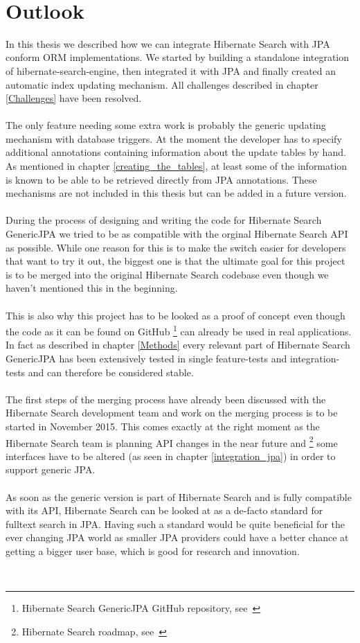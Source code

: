 
~
\pagebreak

\section{Outlook}\label{outlook}

In this thesis we described how we can integrate Hibernate Search with JPA conform ORM implementations. We started by building a standalone integration of hibernate-search-engine, then integrated it with JPA and finally created an automatic index updating mechanism. All challenges described in chapter \ref{Challenges} have been resolved.
\\\\
The only feature needing some extra work is probably the generic updating mechanism with database triggers. At the moment the developer has to specify additional annotations containing information about the update tables by hand. As mentioned in chapter \ref{creating_the_tables}, at least some of the information is known to be able to be retrieved directly from JPA annotations. These mechanisms are not included in this thesis but can be added in a future version.
\\\\
During the process of designing and writing the code for Hibernate Search GenericJPA we tried to be as compatible with the orginal Hibernate Search API as possible. While one reason for this is to make the switch easier for developers that want to try it out, the biggest one is that the ultimate goal for this project is to be merged into the original Hibernate Search codebase even though we haven't mentioned this in the beginning.
\\\\
This is also why this project has to be looked as a proof of concept even though the code as it can be found on GitHub \footnote{Hibernate Search GenericJPA GitHub repository, see~\cite{hibernate_genericjpa_github}} can already be used in real applications. In fact as described in chapter \ref{Methods} every relevant part of Hibernate Search GenericJPA has been extensively tested in single feature-tests and integration-tests and can therefore be considered stable. 
\\\\
The first steps of the merging process have already been discussed with the Hibernate Search development team and work on the merging process is to be started in November 2015. This comes exactly at the right moment as the Hibernate Search team is planning API changes in the near future and \footnote{Hibernate Search roadmap, see~\cite{hibernate_search_roadmap}} some interfaces have to be altered (as seen in chapter \ref{integration_jpa}) in order to support generic JPA.
\\\\
As soon as the generic version is part of Hibernate Search and is fully compatible with its API, Hibernate Search can be looked at as a de-facto standard for fulltext search in JPA. Having such a standard would be quite beneficial for the ever changing JPA world as smaller JPA providers could have a better chance at getting a bigger user base, which is good for research and innovation.

\pagebreak
~